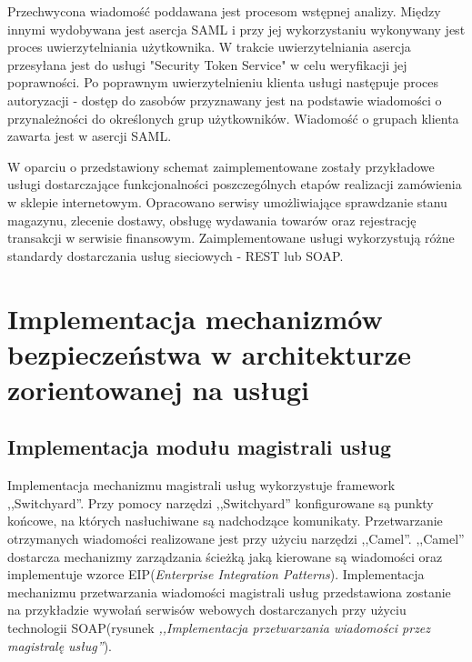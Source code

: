 	Przechwycona wiadomość poddawana jest procesom wstępnej analizy. Między innymi wydobywana jest asercja SAML i przy jej wykorzystaniu wykonywany jest proces uwierzytelniania użytkownika. W trakcie uwierzytelniania asercja przesyłana jest do usługi "Security Token Service" w celu weryfikacji jej poprawności. Po poprawnym uwierzytelnieniu klienta usługi następuje proces autoryzacji - dostęp do zasobów przyznawany jest na podstawie wiadomości o przynależności do określonych grup użytkowników. Wiadomość o grupach klienta zawarta jest w asercji SAML.

	W oparciu o przedstawiony schemat zaimplementowane zostały przykładowe usługi dostarczające funkcjonalności poszczególnych etapów realizacji zamówienia w sklepie internetowym. Opracowano serwisy umożliwiające sprawdzanie stanu magazynu, zlecenie dostawy, obsługę wydawania towarów oraz rejestrację transakcji w serwisie finansowym. Zaimplementowane usługi wykorzystują różne standardy dostarczania usług sieciowych - REST lub SOAP. 
	


\section{Implementacja mechanizmów bezpieczeństwa w architekturze zorientowanej na usługi}

\subsection{Implementacja modułu magistrali usług}

	Implementacja mechanizmu magistrali usług wykorzystuje framework ,,Switchyard''. Przy pomocy narzędzi ,,Switchyard'' konfigurowane są punkty końcowe, na których nasłuchiwane są nadchodzące komunikaty. Przetwarzanie otrzymanych wiadomości realizowane jest przy użyciu narzędzi ,,Camel''. ,,Camel'' dostarcza mechanizmy zarządzania ścieżką jaką kierowane są wiadomości oraz implementuje wzorce EIP(\textit{Enterprise Integration Patterns}). Implementacja mechanizmu przetwarzania wiadomości magistrali usług przedstawiona zostanie na przykładzie wywołań serwisów webowych dostarczanych przy użyciu technologii SOAP(rysunek \textit{,,Implementacja przetwarzania wiadomości przez magistralę usług''}).

